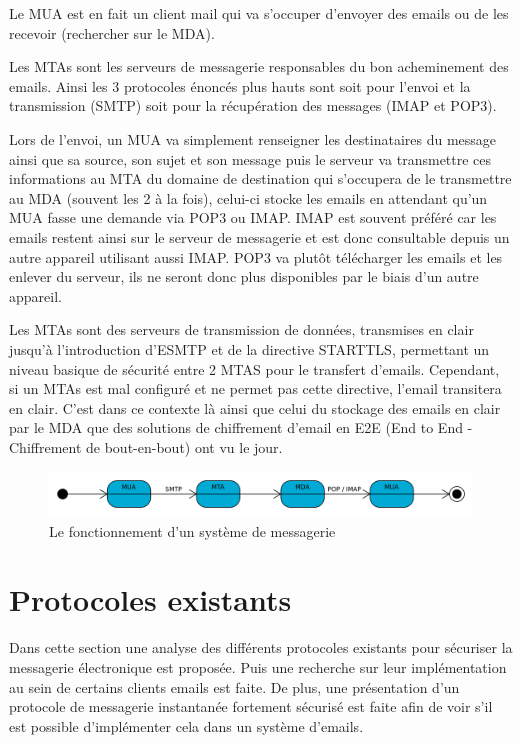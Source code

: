 Le MUA est en fait un client mail qui va s'occuper d'envoyer des emails ou de les recevoir (rechercher sur le MDA). 
 
 Les MTAs sont les serveurs de messagerie responsables du bon acheminement des emails. Ainsi les 3 protocoles énoncés plus hauts sont soit pour l'envoi et la transmission (SMTP) soit pour la récupération des messages (IMAP et POP3). 
 
 Lors de l'envoi, un MUA va simplement renseigner les destinataires du message ainsi que sa source, son sujet et son message puis le serveur va transmettre ces informations au MTA du domaine de destination qui s'occupera de le transmettre au MDA (souvent les 2 à la fois), celui-ci stocke les emails en attendant qu'un MUA fasse une demande via POP3 ou IMAP. IMAP est souvent préféré car les emails restent ainsi sur le serveur de messagerie et est donc consultable depuis un autre appareil utilisant aussi IMAP. POP3 va plutôt télécharger les emails et les enlever du serveur, ils ne seront donc plus disponibles par le biais d'un autre appareil.
 
 Les MTAs sont des serveurs de transmission de données, transmises en clair jusqu'à l'introduction d'ESMTP et de la directive STARTTLS, permettant un niveau basique de sécurité entre 2 MTAS pour le transfert d'emails. Cependant, si un MTAs est mal configuré et ne permet pas cette directive, l'email transitera en clair. C'est dans ce contexte là ainsi que celui du stockage des emails en clair par le MDA que des solutions de chiffrement d'email en E2E (End to End - Chiffrement de bout-en-bout) ont vu le jour.
 
\begin{figure}[h!]
	\includegraphics[width=14cm]{images/Etapes_envoi_email.png}
	\centering
	\caption{Le fonctionnement d'un système de messagerie~\cite{mailGlobal}}
	\label{fig:mailGlobal}
\end{figure}

\section{Protocoles existants}
Dans cette section une analyse des différents protocoles existants pour sécuriser la messagerie électronique est proposée. Puis une recherche sur leur implémentation au sein de certains clients emails est faite. De plus, une présentation d'un protocole de messagerie instantanée fortement sécurisé est faite afin de voir s'il est possible d'implémenter cela dans un système d'emails.

